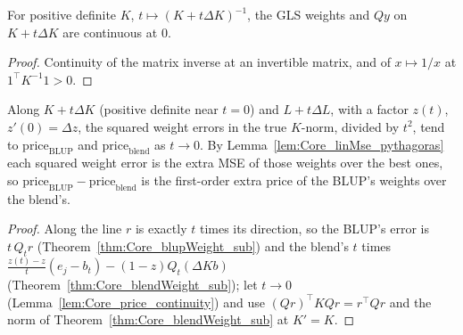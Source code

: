 \begin{lemma}\label{lem:Core_price_continuity}
  \leanok
  For positive definite $K$, $t \mapsto (K + t\Delta K)^{-1}$, the GLS weights and $Qy$ on
  $K + t\Delta K$ are continuous at $0$.
\end{lemma}
\begin{proof}
  \leanok
  Continuity of the matrix inverse at an invertible matrix, and of $x \mapsto 1/x$ at
  $1^\top K^{-1}1 > 0$.
\end{proof}

\begin{theorem}\label{thm:Core_tendsto_price}
  \leanok
  Along $K + t\Delta K$ (positive definite near $t = 0$) and $L + t\Delta L$, with a factor $z(t)$,
  $z'(0) = \Delta z$, the squared weight errors in the true $K$-norm, divided by $t^2$, tend to
  $\mathrm{price}_{\mathrm{BLUP}}$ and $\mathrm{price}_{\mathrm{blend}}$ as $t \to 0$. By
  Lemma~\ref{lem:Core_linMse_pythagoras} each squared weight error is the extra MSE of those
  weights over the best ones, so $\mathrm{price}_{\mathrm{BLUP}} - \mathrm{price}_{\mathrm{blend}}$
  is the first-order extra price of the BLUP's weights over the blend's.
\end{theorem}
\begin{proof}
  \leanok
  Along the line $r$ is exactly $t$ times its direction, so the BLUP's error is $t\,Q_t r$
  (Theorem~\ref{thm:Core_blupWeight_sub}) and the blend's $t$ times
  $\frac{z(t) - z}{t}(e_j - b_t) - (1 - z)Q_t(\Delta K b)$
  (Theorem~\ref{thm:Core_blendWeight_sub}); let $t \to 0$
  (Lemma~\ref{lem:Core_price_continuity}) and use $(Qr)^\top KQr = r^\top Qr$ and the norm of
  Theorem~\ref{thm:Core_blendWeight_sub} at $K' = K$.
\end{proof}

